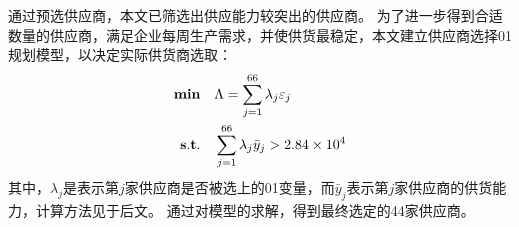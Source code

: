 通过预选供应商，本文已筛选出供应能力较突出的供应商。
为了进一步得到合适数量的供应商，满足企业每周生产需求，并使供货最稳定，本文建立供应商选择0\textendash1规划模型，以决定实际供货商选取：
\begin{equation}
\begin{split}
{\bf min}\quad &\Lambda=\sum_{j=1}^{66} \lambda_j\varepsilon_j \\
{\bf s.t.}\quad &\sum_{j=1}^{66} \lambda_j\bar{y}_j > 2.84\times 10^4
\end{split}
\end{equation}
其中，$\lambda_j$是表示第$j$家供应商是否被选上的0\textendash1变量，而$\bar{y}_j$表示第$j$家供应商的供货能力，计算方法见于后文。
通过对模型的求解，得到最终选定的44家供应商。

